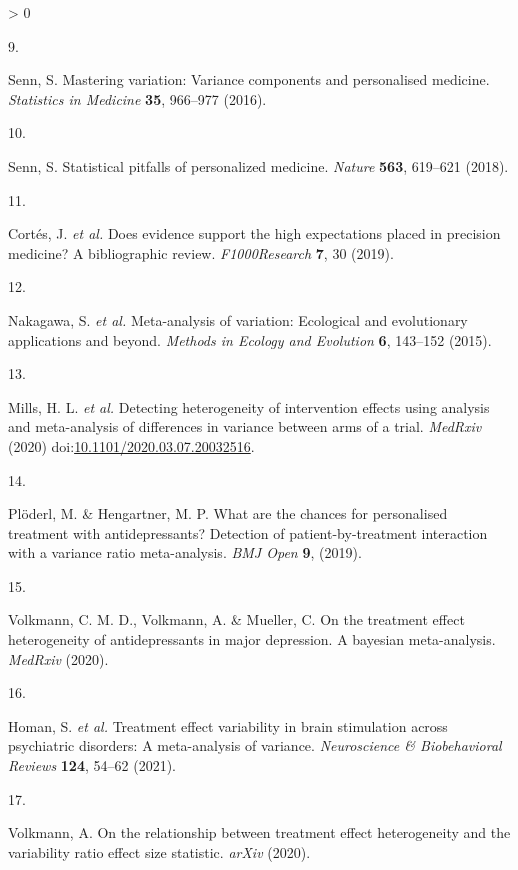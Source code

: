 \documentclass[
  9pt,
  english,
  ,jou,floatsintext]{apa6}
\newlength{\cslhangindent}
\newlength{\csllabelwidth}
\newenvironment{CSLReferences}[2] %
 {%
  \setlength{\parindent}{0pt}
  \ifodd #1 \everypar{\setlength{\hangindent}{\cslhangindent}}\ignorespaces\fi
  \ifnum #2 > 0
  \setlength{\parskip}{#2\baselineskip}
  \fi
 }%
 {}
\newcommand{\CSLLeftMargin}[1]{\parbox[t]{\csllabelwidth}{#1}}
\newcommand{\CSLRightInline}[1]{\parbox[t]{\linewidth - \csllabelwidth}{#1}\break}
\begin{document}
\begin{CSLReferences}{0}{0}
\leavevmode\hypertarget{ref-Senn2016}{}%
\CSLLeftMargin{9. }
\CSLRightInline{Senn, S. Mastering variation: Variance components and personalised medicine. \emph{Statistics in Medicine} \textbf{35}, 966--977 (2016).}

\leavevmode\hypertarget{ref-Senn2018}{}%
\CSLLeftMargin{10. }
\CSLRightInline{Senn, S. Statistical pitfalls of personalized medicine. \emph{Nature} \textbf{563}, 619--621 (2018).}

\leavevmode\hypertarget{ref-Cortes2019}{}%
\CSLLeftMargin{11. }
\CSLRightInline{Cortés, J. \emph{et al.} Does evidence support the high expectations placed in precision medicine? A bibliographic review. \emph{F1000Research} \textbf{7}, 30 (2019).}

\leavevmode\hypertarget{ref-Nakagawa2015}{}%
\CSLLeftMargin{12. }
\CSLRightInline{Nakagawa, S. \emph{et al.} Meta-analysis of variation: Ecological and evolutionary applications and beyond. \emph{Methods in Ecology and Evolution} \textbf{6}, 143--152 (2015).}

\leavevmode\hypertarget{ref-Mills2020}{}%
\CSLLeftMargin{13. }
\CSLRightInline{Mills, H. L. \emph{et al.} Detecting heterogeneity of intervention effects using analysis and meta-analysis of differences in variance between arms of a trial. \emph{MedRxiv} (2020) doi:\href{https://doi.org/10.1101/2020.03.07.20032516}{10.1101/2020.03.07.20032516}.}

\leavevmode\hypertarget{ref-Ploderl2019}{}%
\CSLLeftMargin{14. }
\CSLRightInline{Plöderl, M. \& Hengartner, M. P. What are the chances for personalised treatment with antidepressants? Detection of patient-by-treatment interaction with a variance ratio meta-analysis. \emph{BMJ Open} \textbf{9}, (2019).}

\leavevmode\hypertarget{ref-Volkmann2020}{}%
\CSLLeftMargin{15. }
\CSLRightInline{Volkmann, C. M. D., Volkmann, A. \& Mueller, C. On the treatment effect heterogeneity of antidepressants in major depression. A bayesian meta-analysis. \emph{MedRxiv} (2020).}

\leavevmode\hypertarget{ref-Homan2020a}{}%
\CSLLeftMargin{16. }
\CSLRightInline{Homan, S. \emph{et al.} Treatment effect variability in brain stimulation across psychiatric disorders: A meta-analysis of variance. \emph{{Neuroscience \& Biobehavioral Reviews}} \textbf{124}, 54--62 (2021).}

\leavevmode\hypertarget{ref-Volkmann2020a}{}%
\CSLLeftMargin{17. }
\CSLRightInline{Volkmann, A. On the relationship between treatment effect heterogeneity and the variability ratio effect size statistic. \emph{arXiv} (2020).}


\end{CSLReferences}
\end{document}
